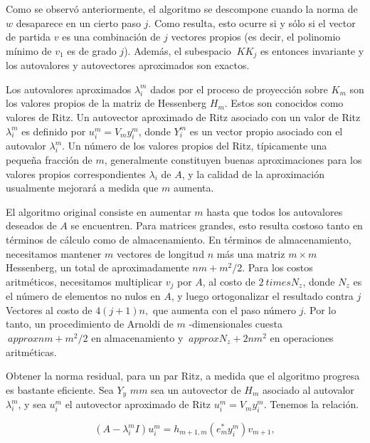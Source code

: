 \documentclass[a4paper,openright,12pt, oneside]{book}
\begin{document}
Como se observ\'o anteriormente, el algoritmo se descompone cuando la norma de $ w $  desaparece en un cierto paso $ j $. Como resulta, esto ocurre si y s\'olo si el vector de partida $ v $ es una combinaci\'on de $ j $ vectores propios (es decir, el polinomio m\'inimo de $ v_1 $ es de grado $ j $). Adem\'as, el subespacio $ \ KK_j $ es entonces invariante y los autovalores y autovectores aproximados son exactos. \cite{SaadNumMeth}

Los autovalores aproximados $ \lambda_i ^{m} $ dados por el proceso de proyecci\'on sobre $ K_m $ son los valores propios de la matriz de Hessenberg $ H_m $. Estos son conocidos como valores de Ritz. Un autovector aproximado de Ritz asociado con un valor de Ritz $ \lambda_i ^ {m} $ es definido por $ u_i ^ {m} = V_m y_i ^ {m} $, donde $
Y_i ^ {m} $ es un vector propio asociado con el autovalor $ \lambda_i ^ {m} $. Un n\'umero de los valores propios del Ritz, t\'ipicamente una peque\~na fracci\'on de $ m $, generalmente constituyen buenas aproximaciones para los valores propios correspondientes $ \lambda_i $ de $ A $, y la calidad de la aproximaci\'on usualmente mejorar\'a a medida que $ m $ aumenta.

El algoritmo original consiste en aumentar $ m $ hasta que todos los autovalores deseados de $ A $ se encuentren. Para matrices grandes, esto resulta costoso tanto en t\'erminos de c\'alculo como de almacenamiento. En t\'erminos de almacenamiento, necesitamos mantener $ m $ vectores de longitud $ n $ m\'as una matriz $ m \times m $ Hessenberg, un total de aproximadamente $ n m + m ^ 2/2 $. Para los costos aritm\'eticos, necesitamos multiplicar $ v_j $ por $ A $, al costo de $ 2 \ times N_z $, donde $ N_z $ es el n\'umero de elementos no nulos en $ A $, y luego ortogonalizar el resultado contra $ j $ Vectores al costo de $ 4 (j + 1) n, $ que aumenta con el paso n\'umero $ j $. Por lo tanto, un procedimiento de Arnoldi de $ m $ -dimensionales cuesta $ \ approx n m + m ^ 2/2 $ en almacenamiento y $ \ approx N_z + 2 n m ^ 2 $ en operaciones aritm\'eticas.


Obtener la norma residual, para un par Ritz, a medida que el algoritmo progresa es bastante eficiente. Sea $Y_y $ $ m {m} $ sea un autovector de $ H_m $ asociado al autovalor $ \lambda_i ^ {m} $, y sea $ u_i ^ {m} $ el autovector aproximado de Ritz $ u_i ^ {m} = V_m y_i ^ {m} $. Tenemos la relaci\'on.

\begin{displaymath}
(A - \lambda_i ^{m}I ) u_i ^{m}= h_{m+1,m}(e_m^{\ast} y_i^{m})v_{m+1},
\end{displaymath}
\end{document}
